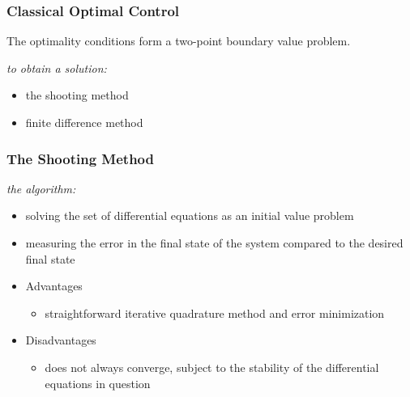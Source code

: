 \documentclass{beamer}
\begin{document}

\begin{frame}
\frametitle{Classical Optimal Control}

The optimality conditions form a two-point boundary value problem.

\textit{to obtain a solution:}

\begin{itemize}
	\item the shooting method
	\item finite difference method
\end{itemize}


\end{frame}




\begin{frame}
\frametitle{The Shooting Method}

\textit{the algorithm:}

\begin{itemize}
\item solving the set of differential equations as an initial value problem

\item measuring the error in the final state of the system compared to the desired final state

\item Advantages
    \begin{itemize}
        \item straightforward iterative quadrature method and error minimization
    \end{itemize}
\item Disadvantages
    \begin{itemize}
        \item does not always converge, subject to the stability of the differential equations in question
    \end{itemize}
\end{itemize}

\end{frame}



\end{document}
